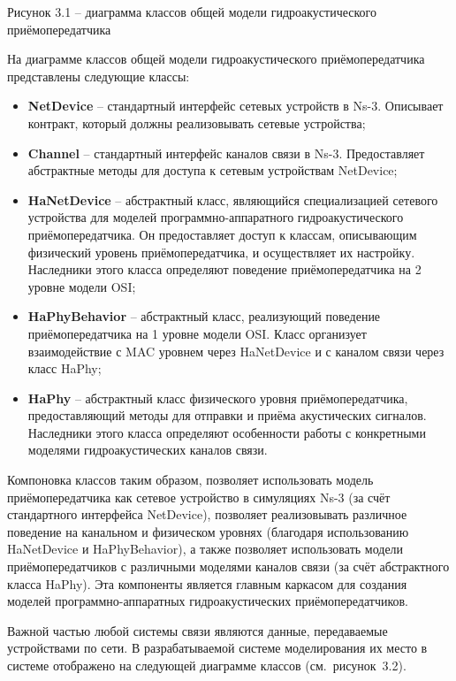 Рисунок 3.1 -- диаграмма классов общей модели гидроакустического
приёмопередатчика

На диаграмме классов общей модели гидроакустического приёмопередатчика
представлены следующие классы:

\begin{itemize}
\item
  \textbf{NetDevice} -- стандартный интерфейс сетевых устройств в Ns-3.
  Описывает контракт, который должны реализовывать сетевые устройства;
\item
  \textbf{Channel} -- стандартный интерфейс каналов связи в Ns-3.
  Предоставляет абстрактные методы для доступа к сетевым устройствам
  NetDevice;
\item
  \textbf{HaNetDevice} -- абстрактный класс, являющийся специализацией
  сетевого устройства для моделей программно-аппаратного
  гидроакустического приёмопередатчика. Он предоставляет доступ к
  классам, описывающим физический уровень приёмопередатчика, и
  осуществляет их настройку. Наследники этого класса определяют
  поведение приёмопередатчика на 2 уровне модели OSI;
\item
  \textbf{HaPhyBehavior} -- абстрактный класс, реализующий поведение
  приёмопередатчика на 1 уровне модели OSI. Класс организует
  взаимодействие с MAC уровнем через HaNetDevice и с каналом связи через
  класс HaPhy;
\item
  \textbf{HaPhy} -- абстрактный класс физического уровня
  приёмопередатчика, предоставляющий методы для отправки и приёма
  акустических сигналов. Наследники этого класса определяют особенности
  работы с конкретными моделями гидроакустических каналов связи.
\end{itemize}

Компоновка классов таким образом, позволяет использовать модель
приёмопередатчика как сетевое устройство в симуляциях Ns-3 (за счёт
стандартного интерфейса NetDevice), позволяет реализовывать различное
поведение на канальном и физическом уровнях (благодаря использованию
HaNetDevice и HaPhyBehavior), а также позволяет использовать модели
приёмопередатчиков с различными моделями каналов связи (за счёт
абстрактного класса HaPhy). Эта компоненты является главным каркасом для
создания моделей программно-аппаратных гидроакустических
приёмопередатчиков.

Важной частью любой системы связи являются данные, передаваемые
устройствами по сети. В разрабатываемой системе моделирования их место в
системе отображено на следующей диаграмме классов (см.~рисунок~3.2).

